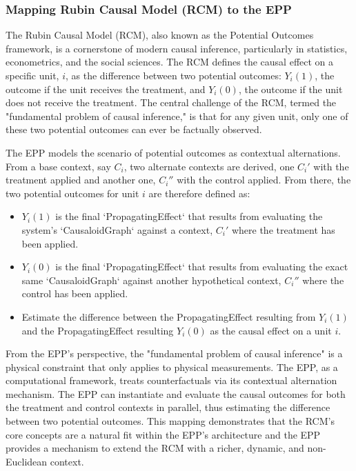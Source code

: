 %
%
\subsubsection{Mapping Rubin Causal Model (RCM) to the EPP}
\label{sec:epp_rubin_causal_model}

The Rubin Causal Model (RCM), also known as the Potential Outcomes framework, is a cornerstone of modern causal inference, particularly in statistics, econometrics, and the social sciences. The RCM defines the causal effect on a specific unit, $i$, as the difference between two potential outcomes: $Y_{i}(1)$, the outcome if the unit receives the treatment, and $Y_{i}(0)$,  the outcome if the unit does not receive the treatment. The central challenge of the RCM, termed the "fundamental problem of causal inference," is that for any given unit, only one of these two potential outcomes can ever be factually observed.  

The EPP models the scenario of potential outcomes as contextual alternations. From a base context, say $C_i$, two alternate contexts are derived, one $C_i'$  with the treatment applied and another one,  $C_i''$ with the control applied. From there, the two potential outcomes for unit $i$ are therefore defined as:

\begin{itemize}
	\item  $Y_i(1)$ is the final `PropagatingEffect` that results from evaluating the system's `CausaloidGraph` against a context, $C_i'$ where the treatment has been applied.
	\item $Y_i(0)$ is the final `PropagatingEffect` that results from evaluating the exact same `CausaloidGraph` against another hypothetical context, $C_i''$ where the control has been applied.
	\item Estimate the difference between the PropagatingEffect resulting from $Y_i(1)$  and the PropagatingEffect resulting $Y_i(0)$ as the causal effect on a unit $i$. 
\end{itemize}

From the EPP's perspective, the "fundamental problem of causal inference" is a physical constraint that only applies to physical measurements. The EPP, as a computational framework, treats counterfactuals via its contextual alternation mechanism. The EPP can instantiate and evaluate the causal outcomes for both the treatment and control contexts in parallel, thus estimating the difference between two potential outcomes. This mapping demonstrates that the RCM's core concepts are a natural fit within the EPP's architecture and the EPP provides a mechanism to extend the RCM with a richer, dynamic, and non-Euclidean context.

